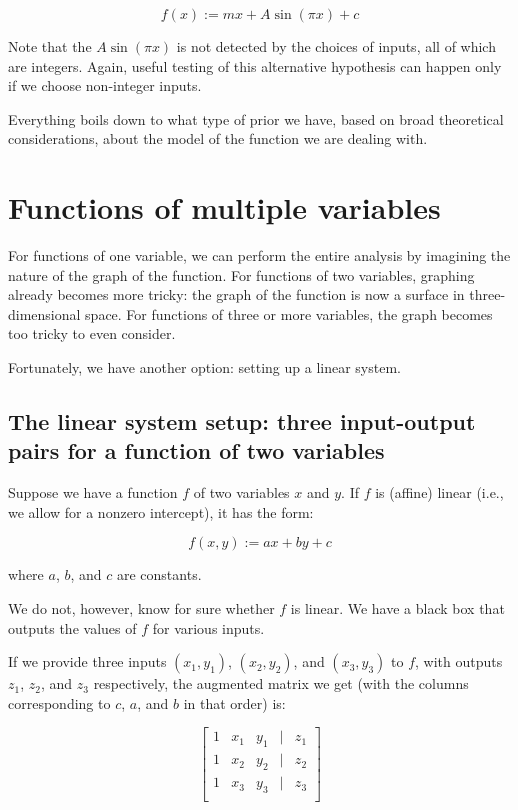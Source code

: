 \documentclass[10pt]{amsart}
\begin{document}
$$f(x) := mx + A \sin(\pi x) + c$$

Note that the $A \sin (\pi x)$ is not detected by the choices of
inputs, all of which are integers. Again, useful testing of this
alternative hypothesis can happen only if we choose non-integer
inputs.

Everything boils down to what type of prior we have, based on broad
theoretical considerations, about the model of the function we are
dealing with.

\section{Functions of multiple variables}

For functions of one variable, we can perform the entire analysis by
imagining the nature of the graph of the function. For functions of
two variables, graphing already becomes more tricky: the graph of the
function is now a surface in three-dimensional space. For functions of
three or more variables, the graph becomes too tricky to even consider.

Fortunately, we have another option: setting up a linear system.

\subsection{The linear system setup: three input-output pairs for a function of two variables}

Suppose we have a function $f$ of two variables $x$ and $y$. If $f$ is
(affine) linear (i.e., we allow for a nonzero intercept), it has the
form:

$$f(x,y) := ax + by + c$$

where $a$, $b$, and $c$ are constants.

We do not, however, know for sure whether $f$ is linear. We have a
black box that outputs the values of $f$ for various inputs.

If we provide three inputs $(x_1,y_1)$, $(x_2,y_2)$, and $(x_3,y_3)$
to $f$, with outputs $z_1$, $z_2$, and $z_3$ respectively, the
augmented matrix we get (with the columns corresponding to $c$, $a$,
and $b$ in that order) is:

$$\left[\begin{matrix} 
1 & x_1 & y_1 &  \mid & z_1 \\
1 & x_2 & y_2 & \mid & z_2 \\
1 & x_3 & y_3 & \mid & z_3 \\
\end{matrix}\right]$$
\end{document}
